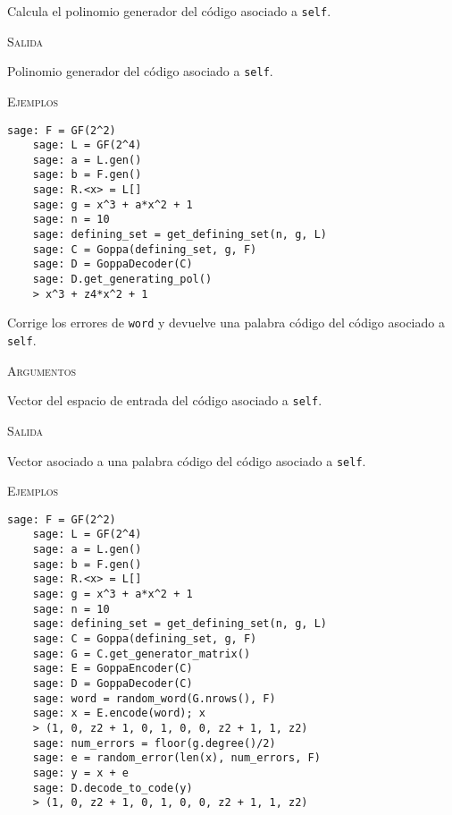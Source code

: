 \begin{description}[leftmargin=1em, font=\normalfont\ttfamily, style=nextline]
\begin{description}[font=\ttfamily, style=nextline]
  \item[get\_generating\_pol(self)] Calcula el polinomio generador del código asociado a \texttt{self}.
  
  \textsc{Salida}
  \begin{description}[font=\normalfont\ttfamily]
      \item[] Polinomio generador del código asociado a \texttt{self}.
  \end{description}

  \textsc{Ejemplos}
  \begin{lstlisting}[gobble=4]
    sage: F = GF(2^2)
    sage: L = GF(2^4)
    sage: a = L.gen()
    sage: b = F.gen()
    sage: R.<x> = L[]
    sage: g = x^3 + a*x^2 + 1
    sage: n = 10
    sage: defining_set = get_defining_set(n, g, L)
    sage: C = Goppa(defining_set, g, F)
    sage: D = GoppaDecoder(C)
    sage: D.get_generating_pol()
    > x^3 + z4*x^2 + 1
  \end{lstlisting}

  \item[decode\_to\_code(self, word)] Corrige los errores de \texttt{word} y devuelve una palabra código del código asociado a \texttt{self}.
      
  \textsc{Argumentos}
  \begin{description}[font=\normalfont\ttfamily]
      \item[word] Vector del espacio de entrada del código asociado a \texttt{self}.
  \end{description}

  \textsc{Salida}
  \begin{description}[font=\normalfont\ttfamily]
      \item[] Vector asociado a una palabra código del código asociado a \texttt{self}.
  \end{description}

  \textsc{Ejemplos}
  \begin{lstlisting}[gobble=4]
    sage: F = GF(2^2)
    sage: L = GF(2^4)
    sage: a = L.gen()
    sage: b = F.gen()
    sage: R.<x> = L[]
    sage: g = x^3 + a*x^2 + 1
    sage: n = 10
    sage: defining_set = get_defining_set(n, g, L)
    sage: C = Goppa(defining_set, g, F)
    sage: G = C.get_generator_matrix()
    sage: E = GoppaEncoder(C)
    sage: D = GoppaDecoder(C)
    sage: word = random_word(G.nrows(), F)
    sage: x = E.encode(word); x
    > (1, 0, z2 + 1, 0, 1, 0, 0, z2 + 1, 1, z2)
    sage: num_errors = floor(g.degree()/2)
    sage: e = random_error(len(x), num_errors, F)
    sage: y = x + e
    sage: D.decode_to_code(y)
    > (1, 0, z2 + 1, 0, 1, 0, 0, z2 + 1, 1, z2)
  \end{lstlisting}


\end{description}
\end{description}
